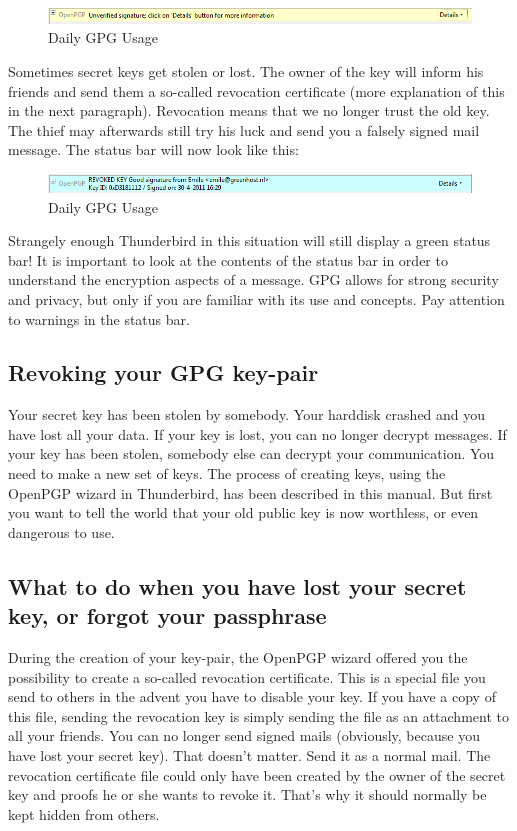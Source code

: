 \begin{figure}[htbp]
\centering
\includegraphics{daily_gpg_33.png}
\caption{Daily GPG Usage}
\end{figure}

Sometimes secret keys get stolen or lost. The owner of the key will
inform his friends and send them a so-called revocation certificate
(more explanation of this in the next paragraph). Revocation means that
we no longer trust the old key. The thief may afterwards still try his
luck and send you a falsely signed mail message. The status bar will now
look like this:

\begin{figure}[htbp]
\centering
\includegraphics{daily_gpg_34.png}
\caption{Daily GPG Usage}
\end{figure}

Strangely enough Thunderbird in this situation will still display a
green status bar! It is important to look at the contents of the status
bar in order to understand the encryption aspects of a message. GPG
allows for strong security and privacy, but only if you are familiar
with its use and concepts. Pay attention to warnings in the status bar.

\subsection{Revoking your GPG key-pair}

Your secret key has been stolen by somebody. Your harddisk crashed and
you have lost all your data. If your key is lost, you can no longer
decrypt messages. If your key has been stolen, somebody else can decrypt
your communication. You need to make a new set of keys. The process of
creating keys, using the OpenPGP wizard in Thunderbird, has been
described in this manual. But first you want to tell the world that your
old public key is now worthless, or even dangerous to use.

\subsection{What to do when you have lost your secret key, or forgot
your passphrase}

During the creation of your key-pair, the OpenPGP wizard offered you the
possibility to create a so-called revocation certificate. This is a
special file you send to others in the advent you have to disable your
key. If you have a copy of this file, sending the revocation key is
simply sending the file as an attachment to all your friends. You can no
longer send signed mails (obviously, because you have lost your secret
key). That doesn't matter. Send it as a normal mail. The revocation
certificate file could only have been created by the owner of the secret
key and proofs he or she wants to revoke it. That's why it should
normally be kept hidden from others.

